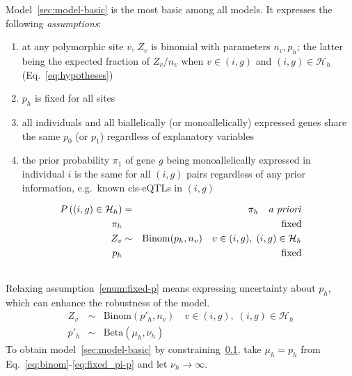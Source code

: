 \documentclass[letterpaper]{article}
\begin{document}
Model~\ref{sec:model-basic} is the most basic among all models.  It expresses the following \emph{assumptions}:
\begin{enumerate}
\item\label{enum:binom} at any polymorphic site \(v\), \(Z_v\) is binomial with parameters \(n_v,p_h\); the latter being the
expected fraction of \(Z_v/n_v\) when
\(v\in(i,g)\) and \((i,g)\in\mathcal{H}_h\) (Eq.~\ref{eq:hypotheses})
\item\label{enum:fixed-p} \(p_h\) is fixed for all sites
\item\label{enum:shared-p_h} all individuals and all biallelically (or monoallelically) expressed genes share
the same \(p_0\) (or \(p_1\)) regardless of explanatory variables
\item\label{enum:prior} the prior probability \(\pi_1\) of gene \(g\) being monoallelically expressed
in individual \(i\) is the same for all \((i,g)\) pairs regardless of any
prior information, e.g.~known cis-eQTLs in \((i,g)\)
\end{enumerate}

\begin{eqnarray}
\label{eq:hypothesis-prior}
P\left( (i,g) \in \mathcal{H}_h \right) &=& \pi_h \quad \text{\emph{a priori}} \\
\label{eq:fixed-hypothesis-prior}
\pi_h && \text{fixed} \\
\label{eq:binom}
Z_v &\sim& \mathrm{Binom}(p_h, n_v) \quad v\in(i,g), \; (i,g)\in \mathcal{H}_h \\
\label{eq:fixed_pi-p}
p_h && \mathrm{fixed}
\end{eqnarray}

\subsection{}
\label{sec:model-beta}

Relaxing assumption~\ref{enum:fixed-p} means expressing uncertainty about \(p_h\), which
can enhance the robustness of the model.
\begin{eqnarray}
Z_v &\sim& \mathrm{Binom}(p'_h, n_v) \quad v\in(i,g), \; (i,g)\in \mathcal{H}_h \\
\label{eq:beta}
p'_h &\sim& \mathrm{Beta}(\mu_h, \nu_h)
\end{eqnarray}
To obtain model~\ref{sec:model-basic} by constraining~\ref{sec:model-beta}, take \(\mu_h=p_h\) from
Eq.~\ref{eq:binom}-\ref{eq:fixed_pi-p} and let \(\nu_h \rightarrow \infty\).
\end{document}
